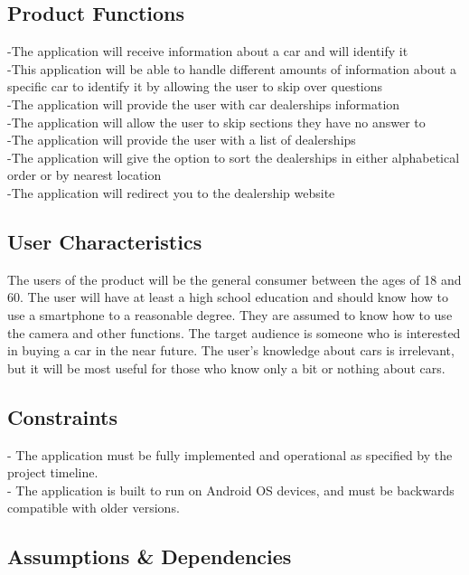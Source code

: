 \documentclass[12pt]{article}
\begin{document}
\subsection{Product Functions}
-The application will receive information about a car and will identify it\\
-This application will be able to handle different amounts of information about a specific car to identify it by allowing the user to skip over questions\\
-The application will provide the user with car dealerships information\\
-The application will allow the user to skip sections they have no answer to\\
-The application will provide the user with a list of dealerships\\
-The application will give the option to sort the dealerships in either alphabetical order or by nearest location\\
-The application will redirect you to the dealership website\\
\subsection{User Characteristics}
The users of the product will be the general consumer between the ages of 18 and 60. The user will have at least a high school education and should know how to use a smartphone to a reasonable degree. They are assumed to know how to use the camera and other functions. The target audience is someone who is interested in buying a car in the near future. The user's knowledge about cars is irrelevant, but it will be most useful for those who know only a bit or nothing about cars.
\subsection{Constraints}
- The application must be fully implemented and operational as specified by the project timeline.\\
- The application is built to run on Android OS devices, and must be backwards compatible with older versions.
\subsection{Assumptions \& Dependencies}
\end{document}
